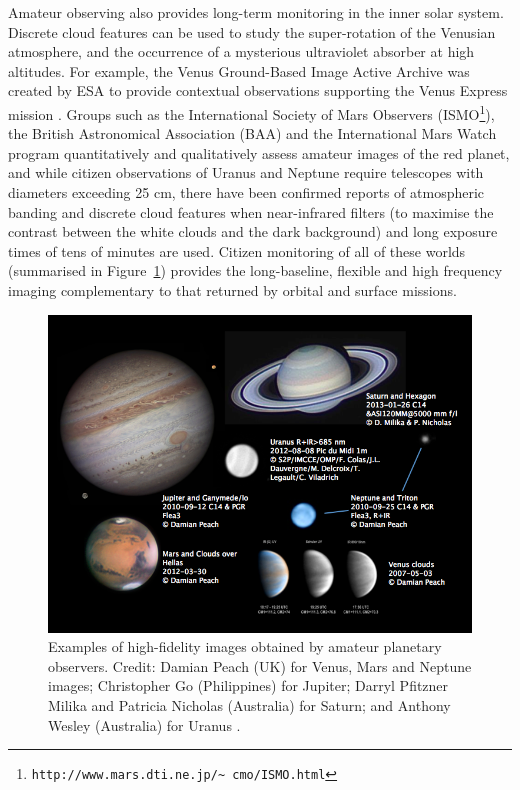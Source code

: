 \documentclass{ar2e}
\def\Fref#1{Figure~\ref{#1}\xspace}
\def\url#1{\texttt{#1}}
\begin{document}
Amateur observing also provides long-term monitoring in the inner solar
system.  Discrete cloud features can be used to study the super-rotation of
the Venusian atmosphere, and the occurrence of a mysterious ultraviolet
absorber at high altitudes.  For example, the Venus Ground-Based Image Active
Archive was created by ESA to provide contextual observations supporting the
Venus Express mission \citep{08barentsen}.   Groups such as the International
Society of Mars Observers
(ISMO\footnote{\url{http://www.mars.dti.ne.jp/\textasciitilde
cmo/ISMO.html}}), the British Astronomical Association (BAA) and the
International Mars Watch program quantitatively and qualitatively assess 
amateur images of the red planet, and while citizen observations of Uranus and
Neptune require telescopes with diameters exceeding 25 cm, there have been
confirmed reports of atmospheric banding and discrete cloud features when
near-infrared filters  (to maximise the contrast between the white clouds and
the dark background) and long exposure times of tens of minutes are used.  
Citizen monitoring of all of these worlds (summarised in \Fref{fig:planets})
provides the long-baseline, flexible and high frequency imaging complementary
to that returned by orbital and surface missions.

\begin{figure}[!ht]
\centering\includegraphics[width=\linewidth]{figs/planets.png}
\caption{Examples of high-fidelity images obtained by amateur planetary
observers.  Credit:  Damian Peach (UK) for Venus, Mars and Neptune images;
Christopher Go (Philippines) for Jupiter; Darryl Pfitzner Milika and Patricia
Nicholas (Australia) for Saturn; and Anthony Wesley (Australia) for Uranus
\citep[see][for a thorough review of amateur planetary
astronomy]{14mousis_proam}.}
\label{fig:planets}
\end{figure}
\end{document}
